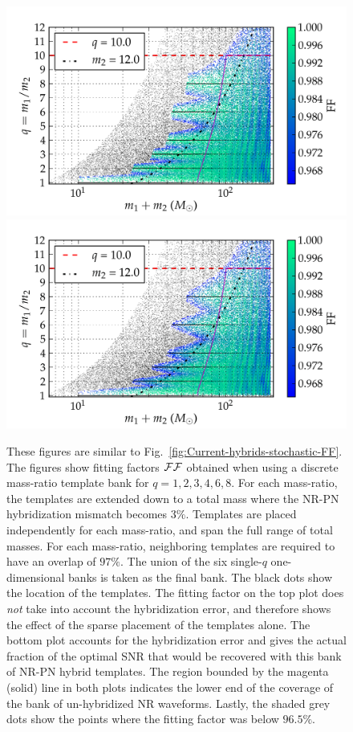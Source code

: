 \begin{figure}
\begin{center}
\includegraphics[width=0.8\columnwidth]{figures/nrhybbank/bank_26022013_02_mtot200_logMq_NOhybMM-tiny.png}
\includegraphics[width=0.8\columnwidth]{figures/nrhybbank/bank_26022013_02_mtot200_logMq_hybMM-tiny.png}
\caption{\label{fig:Current-hybrids-FF}These figures are similar to 
  Fig.~\ref{fig:Current-hybrids-stochastic-FF}. The figures show fitting
  factors $\mathcal{FF}$ obtained when using a discrete mass-ratio template bank for
  $q=1,2,3,4,6,8$. For each mass-ratio, the templates are extended down 
  to a total mass where the NR-PN hybridization mismatch becomes
  $3\%$. Templates are placed independently for each mass-ratio, and span the 
  full range of total masses. For each mass-ratio, neighboring templates are 
  required to have an overlap of $97\%$. The union of the six single-$q$ 
  one-dimensional banks is taken as the final bank. The black dots show the 
  location of the templates. The fitting factor on the top plot does 
  {\em not} take into account the hybridization error, and therefore shows the
  effect of the sparse placement of the templates alone. The bottom plot accounts
  for the hybridization error
  and gives the actual fraction of the optimal SNR that would be recovered
  with this bank of NR-PN hybrid templates. The region bounded by the magenta 
  (solid) line in both plots indicates the lower end of the coverage of the 
  bank of un-hybridized NR waveforms. Lastly, the shaded grey dots show the 
  points where the fitting factor was below $96.5\%$.}
\end{center}
\end{figure}

